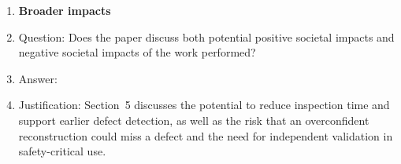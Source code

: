 \begin{enumerate}
\item {\bf Broader impacts}
    \item[] Question: Does the paper discuss both potential positive societal impacts and negative societal impacts of the work performed?
    \item[] Answer: \answerYes{}
    \item[] Justification: Section~5 discusses the potential to reduce
    inspection time and support earlier defect detection, as well as the risk
    that an overconfident reconstruction could miss a defect and the need for
    independent validation in safety-critical use.
    

\end{enumerate}
